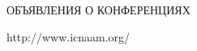 \def\stat{rekl}





   


   \begin{center}





{\prgsh\LARGE


ОБЪЯВЛЕНИЯ О КОНФЕРЕНЦИЯХ}





\end{center}







   \thispagestyle{empty}


   


   \vspace*{3mm}


   


\hfill   {\large{\sf http://www.icnaam.org/}}





\vspace*{3mm}


   








\noindent



